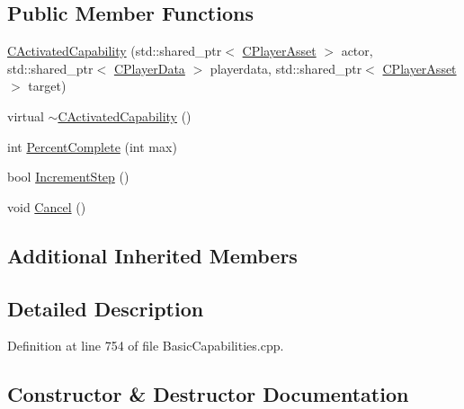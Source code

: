 \subsection*{Public Member Functions}
\begin{DoxyCompactItemize}
\item 
\hyperlink{classCPlayerCapabilityRepair_1_1CActivatedCapability_a6a30357fc9e7f752872c434027e3894e}{C\+Activated\+Capability} (std\+::shared\+\_\+ptr$<$ \hyperlink{classCPlayerAsset}{C\+Player\+Asset} $>$ actor, std\+::shared\+\_\+ptr$<$ \hyperlink{classCPlayerData}{C\+Player\+Data} $>$ playerdata, std\+::shared\+\_\+ptr$<$ \hyperlink{classCPlayerAsset}{C\+Player\+Asset} $>$ target)
\item 
virtual \hyperlink{classCPlayerCapabilityRepair_1_1CActivatedCapability_ae4c632553e0898f8501a3f6bcd71cfaa}{$\sim$\+C\+Activated\+Capability} ()
\item 
int \hyperlink{classCPlayerCapabilityRepair_1_1CActivatedCapability_a88276fec60e08b56daecfd14b36fe888}{Percent\+Complete} (int max)
\item 
bool \hyperlink{classCPlayerCapabilityRepair_1_1CActivatedCapability_a5b5b42dbbda50b29e9f917df3cb0f650}{Increment\+Step} ()
\item 
void \hyperlink{classCPlayerCapabilityRepair_1_1CActivatedCapability_a719cee3446291470987f504739f63215}{Cancel} ()
\end{DoxyCompactItemize}
\subsection*{Additional Inherited Members}


\subsection{Detailed Description}


Definition at line 754 of file Basic\+Capabilities.\+cpp.



\subsection{Constructor \& Destructor Documentation}
\hypertarget{classCPlayerCapabilityRepair_1_1CActivatedCapability_a6a30357fc9e7f752872c434027e3894e}{}\label{classCPlayerCapabilityRepair_1_1CActivatedCapability_a6a30357fc9e7f752872c434027e3894e} 
